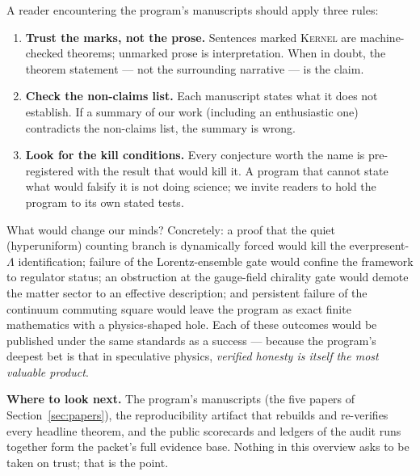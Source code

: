 \documentclass[11pt]{article}
\newcommand{\Kernel}{\textcolor{kernelcolor}{\textsc{Kernel}}}
\newcommand{\Lam}{\Lambda}
\begin{document}
A reader encountering the program's manuscripts should apply three rules:

\begin{enumerate}
\item \textbf{Trust the marks, not the prose.}  Sentences marked \Kernel{}
  are machine-checked theorems; unmarked prose is interpretation.  When in
  doubt, the theorem statement --- not the surrounding narrative --- is
  the claim.
\item \textbf{Check the non-claims list.}  Each manuscript states what it
  does not establish.  If a summary of our work (including an enthusiastic
  one) contradicts the non-claims list, the summary is wrong.
\item \textbf{Look for the kill conditions.}  Every conjecture worth the
  name is pre-registered with the result that would kill it.  A program
  that cannot state what would falsify it is not doing science; we invite
  readers to hold the program to its own stated tests.
\end{enumerate}

What would change our minds?  Concretely: a proof that the quiet
(hyperuniform) counting branch is dynamically forced would kill the
everpresent-$\Lam$ identification; failure of the Lorentz-ensemble gate
would confine the framework to regulator status; an obstruction at the
gauge-field chirality gate would demote the matter sector to an effective
description; and persistent failure of the continuum commuting square
would leave the program as exact finite mathematics with a physics-shaped
hole.  Each of these outcomes would be published under the same standards
as a success --- because the program's deepest bet is that in speculative
physics, \emph{verified honesty is itself the most valuable product}.

\bigskip

\noindent\textbf{Where to look next.}  The program's manuscripts (the five
papers of Section~\ref{sec:papers}), the reproducibility artifact that
rebuilds and re-verifies every headline theorem, and the public scorecards
and ledgers of the audit runs together form the packet's full evidence
base.  Nothing in this overview asks to be taken on trust; that is the
point.
\end{document}
